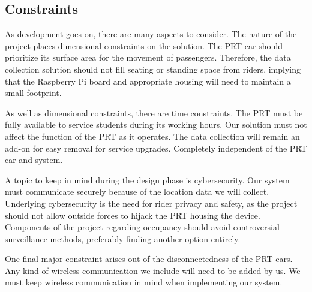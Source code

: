 \subsection{Constraints}
As development goes on, there are many aspects to consider. The nature of the project places dimensional constraints on the solution. The PRT car should prioritize its surface area for the movement of passengers. Therefore, the data collection solution should not fill seating or standing space from riders, implying that the Raspberry Pi board and appropriate housing will need to maintain a small footprint.

As well as dimensional constraints, there are time constraints. The PRT must be fully available to service students during its working hours. Our solution must not affect the function of the PRT as it operates. The data collection will remain an add-on for easy removal for service upgrades. Completely independent of the PRT car and system.

A topic to keep in mind during the design phase is cybersecurity. Our system must communicate securely because of the location data we will collect. Underlying cybersecurity is the need for rider privacy and safety, as the project should not allow outside forces to hijack the PRT housing the device. Components of the project regarding occupancy should avoid controversial surveillance methods, preferably finding another option entirely.

One final major constraint arises out of the disconnectedness of the PRT cars. Any kind of wireless communication we include will need to be added by us. We must keep wireless communication in mind when implementing our system.
